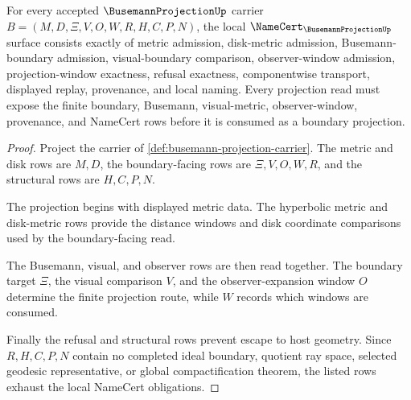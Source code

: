 \begin{theorem}
\label{thm:busemann-projection-namecert-obligations}
For every accepted $\BusemannProjectionUp$ carrier $B=(M,D,\Xi,V,O,W,R,H,C,P,N)$, the local $\NameCert_{\BusemannProjectionUp}$ surface consists exactly of metric admission, disk-metric admission, Busemann-boundary admission, visual-boundary comparison, observer-window admission, projection-window exactness, refusal exactness, componentwise transport, displayed replay, provenance, and local naming. Every projection read must expose the finite boundary, Busemann, visual-metric, observer-window, provenance, and NameCert rows before it is consumed as a boundary projection.
\end{theorem}
\begin{proof}
Project the carrier of \autoref{def:busemann-projection-carrier}. The metric and disk rows are $M,D$, the boundary-facing rows are $\Xi,V,O,W,R$, and the structural rows are $H,C,P,N$.

The projection begins with displayed metric data. The hyperbolic metric and disk-metric rows provide the distance windows and disk coordinate comparisons used by the boundary-facing read.

The Busemann, visual, and observer rows are then read together. The boundary target $\Xi$, the visual comparison $V$, and the observer-expansion window $O$ determine the finite projection route, while $W$ records which windows are consumed.

Finally the refusal and structural rows prevent escape to host geometry. Since $R,H,C,P,N$ contain no completed ideal boundary, quotient ray space, selected geodesic representative, or global compactification theorem, the listed rows exhaust the local NameCert obligations.
\end{proof}



